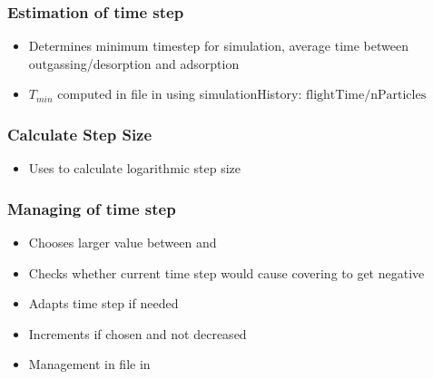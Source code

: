 \subsubsection{Estimation of time step }
\begin{itemize}[noitemsep,topsep=0pt]
\item Determines minimum timestep for simulation, average time between outgassing/desorption and adsorption
\item $T_{min}$ computed in  file in  using simulationHistory: $\text{flightTime}/\text{nParticles}$ 
\end{itemize}

\subsubsection{Calculate Step Size}
\begin{itemize}[noitemsep,topsep=0pt]
\item Uses  to calculate logarithmic step size
\end{itemize}

\subsubsection{Managing of time step }
\begin{itemize}[noitemsep,topsep=0pt]
\item Chooses larger value between  and 
\item Checks whether current time step would cause covering to get negative
\item Adapts time step if needed
\item Increments  if  chosen and not decreased
\item Management in  file in 
\end{itemize}


